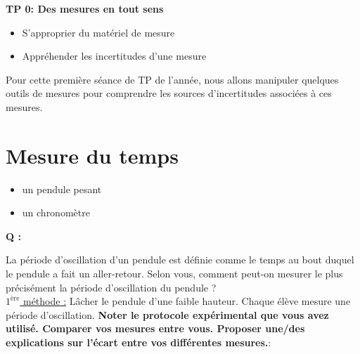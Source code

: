 
\renewcommand{\thesubsection}{\textcolor{red}{\Roman{section}.\arabic{subsection}}}
\renewcommand{\thesubsubsection}{\textcolor{red}{\Roman{section}.\arabic{subsection}.\alph{subsubsection}}}

\setcounter{section}{0}
\sndEnTeteTPO

\begin{center}
\begin{mdframed}[style=titr, leftmargin=60pt, rightmargin=60pt, innertopmargin=7pt, innerbottommargin=7pt, innerrightmargin=8pt, innerleftmargin=8pt]

\begin{center}
\large{\textbf{TP 0: Des mesures en tout sens}}
\end{center}

\end{mdframed}
\end{center}



\begin{tcolorbox}[colback=blue!5!white,colframe=blue!75!black,title=Objectifs de la séance :]
\begin{itemize}
    \item S'approprier du matériel de mesure
    \item Appréhender les incertitudes d'une mesure
\end{itemize}
\end{tcolorbox}

Pour cette première séance de TP de l'année, nous allons manipuler quelques outils de mesures pour comprendre les sources d'incertitudes associées à ces mesures.

\section{Mesure du temps}
\begin{mdframed}[style=autreexo]
\textbf{}
\begin{itemize}
    \item un pendule pesant
    \item un chronomètre
\end{itemize}
\end{mdframed}
\begin{Large}{\textbf{Q :}} \end{Large} La période d'oscillation d'un pendule est définie comme le temps au bout duquel le pendule a fait un aller-retour. Selon vous, comment peut-on mesurer le plus précisément la période d'oscillation du pendule ? \\
\newline
\newline
\underline{$1^{\text{ère}}$ méthode :} Lâcher le pendule d'une faible hauteur. Chaque élève mesure une période d'oscillation. \textbf{Noter le protocole expérimental que vous avez utilisé. Comparer vos mesures entre vous. Proposer une/des explications sur l'écart entre vos différentes mesures.}:
\vspace{8cm}

